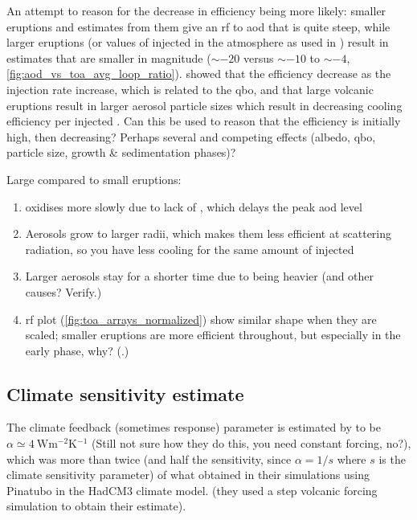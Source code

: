 \documentclass{ametsocV5}
\newcommand{\iso}[1][i]{{#1}njected \ce{SO2}}
\begin{document}
An attempt to reason for the decrease in efficiency being more likely: smaller eruptions
and estimates from them give an \ac{rf} to \ac{aod} that is quite steep, while larger
eruptions (or values of \iso{} in the atmosphere as used in \citet{niemeier2015}) result
in estimates that are smaller in magnitude (\(\sim-20\) versus \(\sim-10\) to
\(\sim-4\), \cref{fig:aod_vs_toa_avg_loop_ratio}). \citet{niemeier2017} showed that the
efficiency decrease as the injection rate increase, which is related to the \ac{qbo},
and that large volcanic eruptions result in larger aerosol particle sizes which result
in decreasing cooling efficiency per \iso{} \citep{english2013, timmreck2018}. Can this
be used to reason that the efficiency is initially high, then decreasing? Perhaps
several and competing effects (albedo, \ac{qbo}, particle size, growth \& sedimentation
phases)?

Large compared to small eruptions:

\begin{enumerate}
  \item {} oxidises more slowly due to lack of , which delays the peak \ac{aod}
        level
  \item Aerosols grow to larger radii, which makes them less efficient at scattering radiation,
        so you have less cooling for the same amount of \iso{}
  \item Larger aerosols stay for a shorter time due to being heavier (and other causes? Verify.)
  \item \ac{rf} plot (\cref{fig:toa_arrays_normalized}) show similar shape when they are scaled;
        smaller eruptions are more efficient throughout, but especially in the early phase, why?
        (.)
\end{enumerate}

\subsection{Climate sensitivity estimate}%
\label{sec:climate-sensitivity-estimate}

The climate feedback (sometimes response) parameter is estimated by \citet{jones2005} to
be \(\alpha \simeq \SI{4}{\watt\metre^{-2}\kelvin^{-1}}\) (Still not sure how they do
this, you need constant forcing, no?), which was more than twice (and half the
sensitivity, since \(\alpha =1/s\) where \(s\) is the climate sensitivity parameter) of
what \citet{gregory2016} obtained in their simulations using Pinatubo in the HadCM3
climate model. (they used a step volcanic forcing simulation to obtain their estimate).
\end{document}
